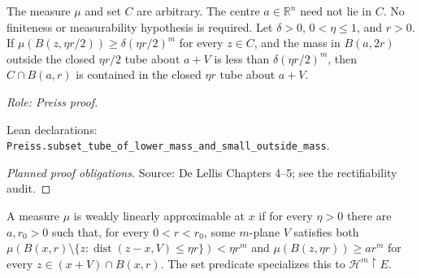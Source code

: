 \begin{lemma}
\label{lem:tube-support-upgrade}

The measure $\mu$ and set $C$ are arbitrary. The centre $a\in\mathbb R^n$ need not lie in $C$. No finiteness or measurability hypothesis is required.
Let $\delta>0$, $0<\eta\leq1$, and $r>0$. If $\mu(B(z,\eta r/2))\geq\delta(\eta r/2)^m$ for every $z\in C$, and the mass in $B(a,2r)$ outside the closed $\eta r/2$ tube about $a+V$ is less than $\delta(\eta r/2)^m$, then $C\cap B(a,r)$ is contained in the closed $\eta r$ tube about $a+V$.
\par\emph{Role: Preiss proof.}
\par Lean declarations: \texttt{Preiss.subset\_tube\_of\_lower\_mass\_and\_small\_outside\_mass}.
\end{lemma}
\begin{proof}[Planned proof obligations]
\par Source: De Lellis Chapters 4--5; see the rectifiability audit.
\end{proof}

\begin{definition}
\label{def:weak-approximation}










A measure $\mu$ is weakly linearly approximable at $x$ if for every $\eta>0$ there are $a,r_0>0$ such that, for every $0<r<r_0$, some $m$-plane $V$ satisfies both $\mu(B(x,r)\setminus\{z:\operatorname{dist}(z-x,V)\leq\eta r\})<\eta r^m$ and $\mu(B(z,\eta r))\geq ar^m$ for every $z\in(x+V)\cap B(x,r)$. The set predicate specializes this to $\mathcal H^m\!\restriction E$.
\end{definition}

